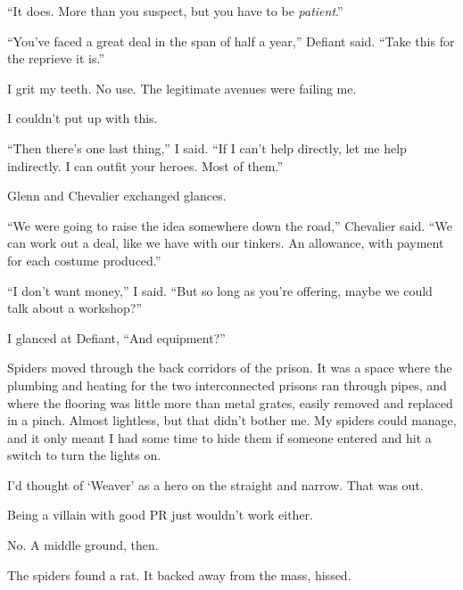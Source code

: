 ``It does.  More than you suspect, but you have to be \emph{patient}.''



``You've faced a great deal in the span of half a year,'' Defiant said.  ``Take this for the reprieve it is.''



I grit my teeth.  No use.  The legitimate avenues were failing me.



I couldn't put up with this.



``Then there's one last thing,'' I said.  ``If I can't help directly, let me help indirectly.  I can outfit your heroes.  Most of them.''



Glenn and Chevalier exchanged glances.



``We were going to raise the idea somewhere down the road,'' Chevalier said.  ``We can work out a deal, like we have with our tinkers.  An allowance, with payment for each costume produced.''



``I don't want money,'' I said.  ``But so long as you're offering, maybe we could talk about a workshop?''



I glanced at Defiant, ``And equipment?''



\blacksquare



Spiders moved through the back corridors of the prison.  It was a space where the plumbing and heating for the two interconnected prisons ran through pipes, and where the flooring was little more than metal grates, easily removed and replaced in a pinch.  Almost lightless, but that didn't bother me.  My spiders could manage, and it only meant I had some time to hide them if someone entered and hit a switch to turn the lights on.



I'd thought of `Weaver' as a hero on the straight and narrow.  That was out.



Being a villain with good PR just wouldn't work either.



No.  A middle ground, then.



The spiders found a rat.  It backed away from the mass, hissed.



